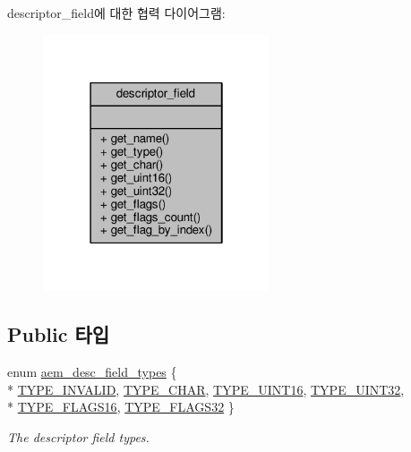 descriptor\+\_\+field에 대한 협력 다이어그램\+:
\nopagebreak
\begin{figure}[H]
\begin{center}
\leavevmode
\includegraphics[width=190pt]{classavdecc__lib_1_1descriptor__field__coll__graph}
\end{center}
\end{figure}
\subsection*{Public 타입}
\begin{DoxyCompactItemize}
\item 
enum \hyperlink{classavdecc__lib_1_1descriptor__field_afcc9e2e668064d50ec69a4f95b154396}{aem\+\_\+desc\+\_\+field\+\_\+types} \{ \\*
\hyperlink{classavdecc__lib_1_1descriptor__field_afcc9e2e668064d50ec69a4f95b154396afeec3d92b10ebeaa68bbb56e4d08691c}{T\+Y\+P\+E\+\_\+\+I\+N\+V\+A\+L\+ID}, 
\hyperlink{classavdecc__lib_1_1descriptor__field_afcc9e2e668064d50ec69a4f95b154396a2c8735de6cf799483eefed0e90a386f5}{T\+Y\+P\+E\+\_\+\+C\+H\+AR}, 
\hyperlink{classavdecc__lib_1_1descriptor__field_afcc9e2e668064d50ec69a4f95b154396ac476ff4afefdbf17ca690f6606472d64}{T\+Y\+P\+E\+\_\+\+U\+I\+N\+T16}, 
\hyperlink{classavdecc__lib_1_1descriptor__field_afcc9e2e668064d50ec69a4f95b154396ab799ec7307bc71b0219c60e5853e50a4}{T\+Y\+P\+E\+\_\+\+U\+I\+N\+T32}, 
\\*
\hyperlink{classavdecc__lib_1_1descriptor__field_afcc9e2e668064d50ec69a4f95b154396a9d459becf9813d51539fcc01e36201fd}{T\+Y\+P\+E\+\_\+\+F\+L\+A\+G\+S16}, 
\hyperlink{classavdecc__lib_1_1descriptor__field_afcc9e2e668064d50ec69a4f95b154396a797f2aadec8284c40a163c649e46b411}{T\+Y\+P\+E\+\_\+\+F\+L\+A\+G\+S32}
 \}\begin{DoxyCompactList}\small\item\em The descriptor field types. \end{DoxyCompactList}
\end{DoxyCompactItemize}

